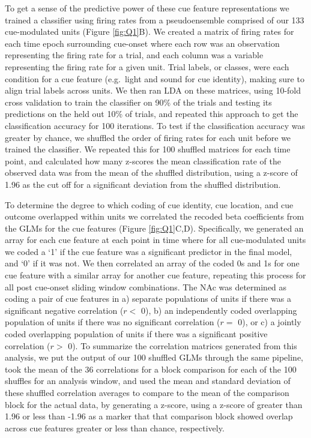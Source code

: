 \documentclass[11pt]{article}
\providecommand{\DIFadd}[1]{{\protect\color{red} \sf #1}} %
\providecommand{\DIFdel}[1]{} %
\providecommand{\DIFaddbegin}{} %
\providecommand{\DIFaddend}{} %
\providecommand{\DIFdelbegin}{} %
\providecommand{\DIFdelend}{} %
\newcommand{\DIFscaledelfig}{0.5}
\newlength{\DIFdelgraphicswidth} %
\newlength{\DIFdelgraphicsheight} %
\newcommand{\DIFaddincludegraphics}[2][]{{\color{red}\fbox{\DIFOincludegraphics[#1]{#2}}}} %
\newcommand{\DIFdelincludegraphics}[2][]{%
\sbox{\DIFdelgraphicsbox}{\DIFOincludegraphics[#1]{#2}}%
\settoboxwidth{\DIFdelgraphicswidth}{\DIFdelgraphicsbox} %
\settoboxtotalheight{\DIFdelgraphicsheight}{\DIFdelgraphicsbox} %
\scalebox{\DIFscaledelfig}{%
\parbox[b]{\DIFdelgraphicswidth}{\usebox{\DIFdelgraphicsbox}\\[-\baselineskip] \rule{\DIFdelgraphicswidth}{0em}}\llap{\resizebox{\DIFdelgraphicswidth}{\DIFdelgraphicsheight}{%
\setlength{\unitlength}{\DIFdelgraphicswidth}%
\begin{picture}(1,1)%
\thicklines\linethickness{2pt} %
{\color[rgb]{1,0,0}\put(0,0){\framebox(1,1){}}}%
{\color[rgb]{1,0,0}\put(0,0){\line( 1,1){1}}}%
{\color[rgb]{1,0,0}\put(0,1){\line(1,-1){1}}}%
\end{picture}%
}\hspace*{3pt}}} %
} %
\DeclareRobustCommand{\DIFaddbegin}{\DIFOaddbegin \let\includegraphics\DIFaddincludegraphics} %
\DeclareRobustCommand{\DIFaddend}{\DIFOaddend \let\includegraphics\DIFOincludegraphics} %
\DeclareRobustCommand{\DIFdelbegin}{\DIFOdelbegin \let\includegraphics\DIFdelincludegraphics} %
\DeclareRobustCommand{\DIFdelend}{\DIFOaddend \let\includegraphics\DIFOincludegraphics} %
\begin{document}
\DIFadd{To get a sense of the predictive power of these cue feature representations we trained a classifier using firing rates from a pseudoensemble comprised of our 133 cue-modulated units (Figure \ref{fig:Q1}B). We created a matrix of firing rates for each time epoch surrounding cue-onset where each row was an observation representing the firing rate for a trial, and each column was a variable representing the firing rate for a given unit. Trial labels, or classes, were each condition for a cue feature (e.g.\ light and sound for cue identity), making sure to align trial labels across units. We then ran LDA on these matrices, using 10-fold cross validation to train the classifier on 90\% of the trials and testing its predictions on the held out 10\% of trials, and repeated this approach to get the classification accuracy for 100 iterations. To test if the classification accuracy was greater by }\DIFaddend chance, we shuffled the \DIFdelbegin \DIFdel{trial }\DIFdelend order of firing rates for \DIFdelbegin \DIFdel{a particular unit within a time bin, and took the average of this value over }\DIFdelend \DIFaddbegin \DIFadd{each unit before we trained the classifier. We repeated this for }\DIFaddend 100 \DIFdelbegin \DIFdel{shuffles}\DIFdelend \DIFaddbegin \DIFadd{shuffled matrices for each time point, and calculated how many z-scores the mean classification rate of the observed data was from the mean of the shuffled distribution, using a z-score of 1.96 as the cut off for a significant deviation from the shuffled distribution.
}

\DIFadd{To determine the degree to which coding of cue identity, cue location, and cue outcome overlapped within units we correlated the recoded beta coefficients from the GLMs for the cue features (Figure \ref{fig:Q1}C,D). Specifically, we generated an array for each cue feature at each point in time where for all cue-modulated units we coded a `1' if the cue feature was a significant predictor in the final model, and `0' if it was not. We then correlated an array of the coded 0s and 1s for one cue feature with a similar array for another cue feature, repeating this process for all post cue-onset sliding window combinations. The NAc was determined as coding a pair of cue features in a) separate populations of units if there was a significant negative correlation ($r < $ 0), b) an independently coded overlapping population of units if there was no significant correlation ($r = $ 0), or c) a jointly coded overlapping population of units if there was a significant positive correlation ($r > $ 0). To summarize the correlation matrices generated from this analysis, we put the output of our 100 shuffled GLMs through the same pipeline, took the mean of the 36 correlations for a block comparison for each of the 100 shuffles for an analysis window, and used the mean and standard deviation of these shuffled correlation averages to compare to the mean of the comparison block for the actual data, by generating a z-score, using a z-score of greater than 1.96 or less than -1.96 as a marker that that comparison block showed overlap across cue features greater or less than chance, respectively}\DIFaddend .
\end{document}
